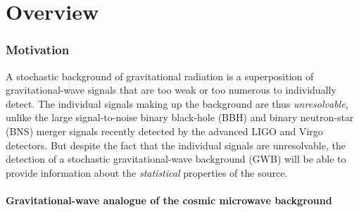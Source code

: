 \part{Overview}

\section{Motivation}
\label{s:motivation}

A stochastic background of gravitational radiation 
is a superposition of gravitational-wave signals that
are too weak or too numerous to individually detect.
The individual signals making up the background are thus
{\em unresolvable}, unlike the large signal-to-noise 
binary black-hole (BBH) and binary neutron-star (BNS)
merger signals recently detected by the advanced LIGO 
and Virgo detectors.
But despite the fact that the individual signals are 
unresolvable, the detection of a stochastic 
gravitational-wave background (GWB) will 
be able to provide information about the 
{\em statistical} properties of the source.

\subsection{Gravitational-wave analogue of the cosmic
microwave background}
\label{s:GW_CMB}

